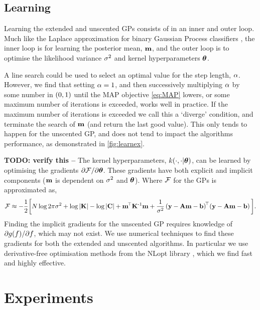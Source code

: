 \documentclass{article} %
\begin{document}
\subsection{Learning}

Learning the extended and unscented GPs consists of in an inner and outer loop.
Much like the Laplace approximation for binary Gaussian Process classifiers
\cite{Rasmussen2006}, the inner loop is for learning the posterior mean,
$\mathbf{m}$, and the outer loop is to optimise the likelihood variance $\sigma^2$ 
and kernel hyperparameters $\boldsymbol\theta$.

A line search could be used to select an optimal value for the step length,
$\alpha$. However, we find that setting $\alpha=1$, and then successively
multiplying $\alpha$ by some number in $\left({0, 1}\right)$ until the MAP objective
\eqref{eq:MAP} lowers, or some maximum number of iterations is exceeded, works 
well in practice. If the maximum number of iterations is exceeded we call this
a `diverge' condition, and terminate the search of $\mathbf{m}$ (and return the
last good value). This only tends to happen for the unscented GP, and does not
tend to impact the algorithms performance, as demonstrated in 
\autoref{fig:learnex}.

\textbf{TODO: verify this --} The kernel hyperparameters,
$k\!\left({{\cdot}, {\cdot|\boldsymbol\theta}}\right)$, can be learned by optimising the gradients
$\partial\mathcal{F}/\partial\boldsymbol\theta$. These gradients have both explicit and
implicit components ($\mathbf{m}$ is dependent on $\sigma^2$ and $\boldsymbol\theta$). Where
$\mathcal{F}$ for the GPs is approximated as,
\begin{equation}
    \mathcal{F} \approx - \frac{1}{2} \bigg[
        N\log{2\pi\ensuremath{\sigma^2}} + \log\left|{\mathbf{K}}\right| 
        - \log\left|{\mathbf{C}}\right|
    + \mathbf{m}^{\!\top}\mathbf{K}^{\text{-}1} \mathbf{m}
    + \frac{1}{\sigma^2}
        \left({\mathbf{y} - \mathbf{A}\mathbf{m} - \mathbf{b}}\right)^{\!\top}\!
        \left({\mathbf{y} - \mathbf{A}\mathbf{m} - \mathbf{b}}\right)
    \bigg].
    \label{eq:fengygp}
\end{equation}
Finding the implicit gradients for the unscented GP requires knowledge of
$\partial g\!\left({{f}}\right)\!/\partial f$, which may not exist. We use
numerical techniques to find these gradients for both the extended and
unscented algorithms. In particular we use derivative-free optimisation methods
from the NLopt library \cite{JohnsonNLOPT}, which we find fast and highly
effective.


\section{Experiments}
\label{sec:experiments}
\end{document}
